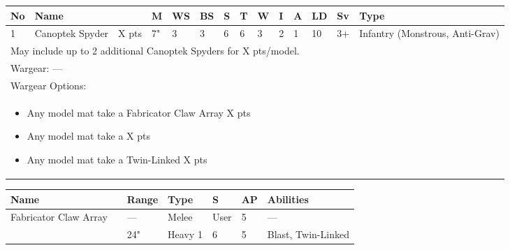\noindent
\begin{tabular}{||m{10pt} m{95pt} m{30pt} m{11pt} m{11pt} m{11pt} m{11pt} m{11pt} m{11pt} m{11pt} m{11pt} m{11pt} m{11pt} m{125pt}||}
	\hline
	No & Name & & M & WS & BS & S & T & W & I & A & LD & Sv & Type \\
	\hline
	1 & Canoptek Spyder & X pts & 7" & 3 & 3 & 6 & 6 & 3 & 2 & 1 & 10 & 3+ & Infantry (Monstrous, Anti-Grav)\\
	\hline
	\hline
	\multicolumn{14}{||Z{532 pt}||}{May include up to 2 additional Canoptek Spyders for X pts/model.}\\		
	\hline
	\hline
	\multicolumn{14}{||Z{532 pt}||}{Wargear: —}\\
	\multicolumn{14}{||Z{532 pt}||}{Wargear Options:} \\	\multicolumn{14}{||Z{532 pt}||}{\begin{itemize}
			\item Any model mat take a Fabricator Claw Array \hrulefill X pts
			\item Any model mat take a \quickref{Gloom Prism} \hrulefill X pts
			\item Any model mat take a Twin-Linked \quickref{Particle Beamer} \hrulefill X pts
	\end{itemize}} \\
	\hline
\end{tabular}

\noindent
\begin{tabular}{||m{110pt} m{30pt} m{31pt} m{55pt} m{12pt} m{12pt} m{210pt}||}
	\hline
	Name & & Range & Type & S & AP & Abilities \\
	\hline
	Fabricator Claw Array & & — & Melee & User & 5 & — \\
	\quickref{Particle Beamer} & & 24" & Heavy 1 & 6 & 5 & Blast, Twin-Linked \\
	\hline
\end{tabular}

